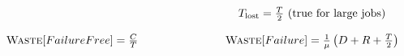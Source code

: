 \begin{frame}
\begin{center}
{\begin{tikzpicture}
    \end{tikzpicture}}
        \end{center}

  $$
  \begin{array}{ccc}
    &\hspace*{2cm}&   \Tlost= \frac{\period}{2}\text{ (true for large jobs)}\\
    & &\\
      \Waste[FailureFree] = \frac{\Cr}{\period} & &
      \Waste[Failure] = \frac{1}{\mu} \left( \D + \R + \frac{\period}{2} \right)\\
  \end{array}$$

\end{frame}

 



 









